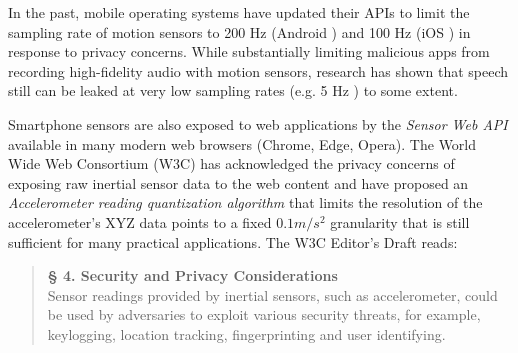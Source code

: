 \documentclass[sigconf, nonacm]{acmart}
\begin{document}
In the past, mobile operating systems have updated their APIs to limit the sampling rate of motion sensors to 200 Hz (Android \cite{AndroidDeveloperSensorDocs}) and 100 Hz (iOS \cite{AppleDeveloperAccelerometerData}\cite{AppleDeveloperGyroscopeData}) in response to privacy concerns.
While substantially limiting malicious apps from recording high-fidelity audio with motion sensors, research has shown that speech still can be leaked at very low sampling rates (e.g. 5 Hz \cite{WatchTheRhythm2024}) to some extent.

Smartphone sensors are also exposed to web applications by the \textit{Sensor Web API} \cite{MDNWebDocsSensorAPI} available in many modern web browsers (Chrome, Edge, Opera).
The World Wide Web Consortium (W3C) has acknowledged the privacy concerns of exposing raw inertial sensor data to the web content and have proposed an \textit{Accelerometer reading quantization algorithm} \cite{W3CAccelerometerQuantization} that limits the resolution of the accelerometer's XYZ data points to a fixed $0.1 m/s^2$ granularity that is still sufficient for many practical applications.
The W3C Editor's Draft \cite{W3CAccelerometerQuantization} reads:
\begin{quote}
  \vspace{0.1cm}
  \textbf{§ 4. Security and Privacy Considerations} \\
  Sensor readings provided by inertial sensors, such as accelerometer, could be used by adversaries to exploit various security threats, for example, keylogging, location tracking, fingerprinting and user identifying.
\end{quote}
\end{document}
